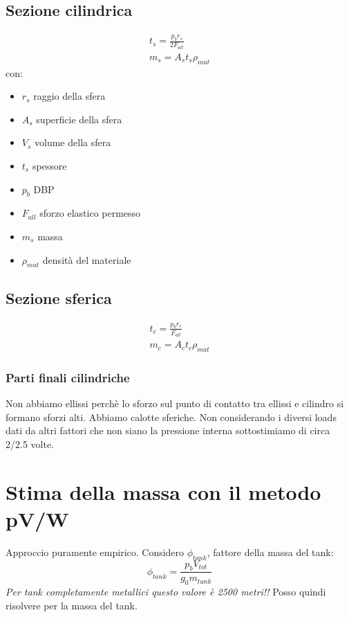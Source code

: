     \subsection{Sezione cilindrica}
    \begin{eqnarray*}
        t_s = \frac{p_b r_s}{2 F_{all}}\\
        m_s = A_s t_s \rho_{mat}
    \end{eqnarray*}
    con: 
    \begin{itemize}
        \item $r_s$ raggio della sfera
        \item $A_s$ superficie della sfera
        \item $V_s$ volume della sfera
        \item $t_s$ spessore
        \item $p_b$ DBP
        \item $F_{all}$ sforzo elastico permesso
        \item $m_s$ massa
        \item $\rho_{mat}$ densità del materiale
    \end{itemize}
    \subsection{Sezione sferica}
    \begin{eqnarray*}
        t_c = \frac{p_b r_c}{F_{all}}\\
        m_c = A_c t_c \rho_{mat}
    \end{eqnarray*}
    \subsubsection{Parti finali cilindriche}
    Non abbiamo ellissi perchè lo sforzo sul punto di contatto tra 
    ellissi e cilindro si formano sforzi alti. Abbiamo calotte sferiche.
    Non considerando i diversi loads dati da altri fattori che non siano la 
    pressione interna sottostimiamo di circa 2/2.5 volte.
    \section{Stima della massa con il metodo pV/W}
    Approccio puramente empirico. Considero $\phi_{tank}$, fattore della massa del tank:
    \begin{equation*}
        \phi_{tank} = \frac{p_b V_{tot}}{g_0 m_{tank}}
    \end{equation*}
    \emph{Per tank completamente metallici questo valore è 2500 metri!!}
    Posso quindi risolvere per la massa del tank.
